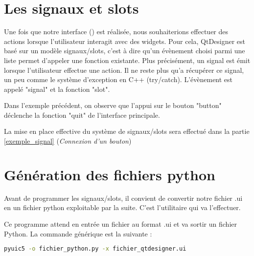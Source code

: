 \section{Les signaux et slots}

Une fois que notre interface () est réalisée, nous souhaiterions effectuer des actions lorsque l'utilisateur interagit avec des widgets. \newline \newline
Pour cela, QtDesigner est basé sur un modèle signaux/slots, c'est à dire qu'un évènement choisi parmi une liste permet d'appeler une fonction existante. \newline
Plus précisément, un signal est émit lorsque l'utilisateur effectue une action. Il ne reste plus qu'a récupérer ce signal, un peu comme le système d'exception en C++ (try/catch).
L'évènement est appelé "signal" et la fonction "slot". \newline \newline



Dans l'exemple précédent, on observe que l'appui sur le bouton "button" déclenche la fonction "quit" de l'interface principale.

La mise en place effective du système de signaux/slots sera effectué dans la partie  \ref{exemple_signal} (\textit{Connexion d'un bouton})

\section{Génération des fichiers python}

Avant de programmer les signaux/slots, il convient de convertir notre fichier .ui en un fichier python exploitable par la suite. C'est l'utilitaire  qui va l'effectuer. \newline

Ce programme attend en entrée un fichier au format .ui et va sortir un fichier Python. La commande générique est la suivante : 

\begin{lstlisting}[language=bash]
pyuic5 -o fichier_python.py -x fichier_qtdesigner.ui
\end{lstlisting}

